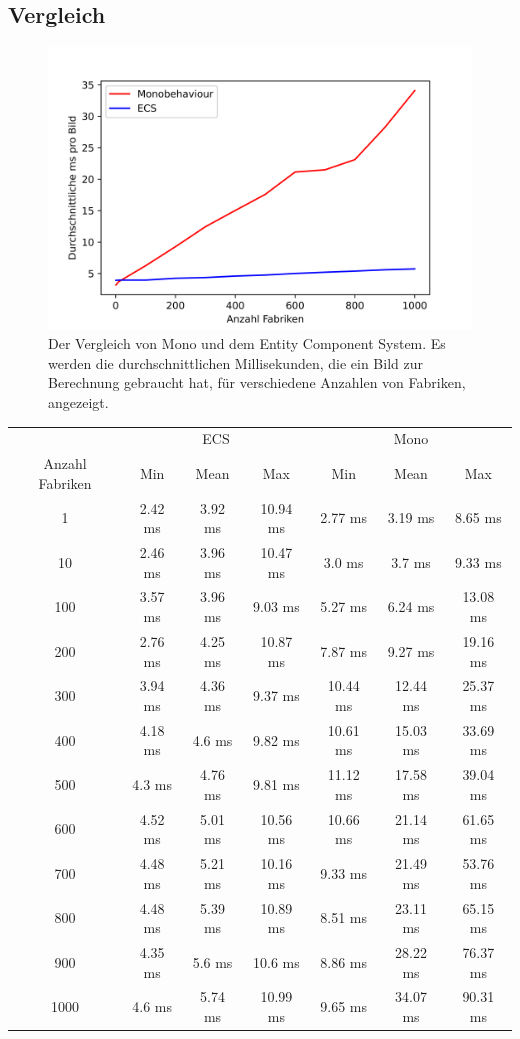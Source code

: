 \subsection{Vergleich}
\begin{figure}[H]
\centering
\includegraphics[scale=1]{Bilder/Benchmark.png}
\caption{Der Vergleich von Mono und dem Entity Component System. Es werden die durchschnittlichen Millisekunden, die ein Bild zur Berechnung gebraucht hat, für verschiedene Anzahlen von Fabriken, angezeigt.}
\label{fig:benchmark}
\end{figure}
\begin{tabular}[h]{c|c|c|c|c|c|c}
 & \multicolumn{3}{c|}{ECS} & \multicolumn{3}{c}{Mono}\\
Anzahl Fabriken & Min & Mean & Max & Min & Mean & Max\\
\hline
1 & 2.42 ms & 3.92 ms & 10.94 ms & 2.77 ms & 3.19 ms & 8.65 ms\\
10 & 2.46 ms & 3.96 ms & 10.47 ms & 3.0 ms & 3.7 ms & 9.33 ms\\
100 & 3.57 ms & 3.96 ms & 9.03 ms & 5.27 ms & 6.24 ms & 13.08 ms\\
200 & 2.76 ms & 4.25 ms & 10.87 ms & 7.87 ms & 9.27 ms & 19.16 ms\\
300 & 3.94 ms & 4.36 ms & 9.37 ms & 10.44 ms & 12.44 ms & 25.37 ms\\
400 & 4.18 ms & 4.6 ms & 9.82 ms & 10.61 ms & 15.03 ms & 33.69 ms\\
500 & 4.3 ms & 4.76 ms & 9.81 ms & 11.12 ms & 17.58 ms & 39.04 ms\\
600 & 4.52 ms & 5.01 ms & 10.56 ms & 10.66 ms & 21.14 ms & 61.65 ms\\
700 & 4.48 ms & 5.21 ms & 10.16 ms & 9.33 ms & 21.49 ms & 53.76 ms\\
800 & 4.48 ms & 5.39 ms & 10.89 ms & 8.51 ms & 23.11 ms & 65.15 ms\\
900 & 4.35 ms & 5.6 ms & 10.6 ms & 8.86 ms & 28.22 ms & 76.37 ms\\
1000 & 4.6 ms & 5.74 ms & 10.99 ms & 9.65 ms & 34.07 ms & 90.31 ms\\
\end{tabular}
